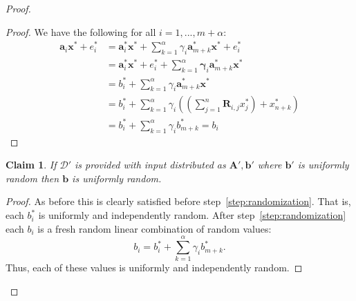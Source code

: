 \documentclass[11pt]{article}
\newcommand{\vect}[1]{\ensuremath{\textbf{#1}}}
\newcommand{\D}{\mathcal{D}}
\newtheorem{claim}[theorem]{Claim}
\newcommand{\vA}{\vect{A}}
\newcommand{\vR}{\vect{R}}
\newcommand{\vx}{\vect{x}}
\newcommand{\va}{\vect{a}}
\newcommand{\vb}{\vect{b}}
\begin{document}
\begin{proof}
\begin{proof}
We have the following for all $i=1,..., m+\alpha$:
\begin{align*}
\va_i \vx^* + e_i^* &=\va^*_i\vx^*+\sum_{k=1}^\alpha \gamma_{i} \va^*_{m+k}\vx^*+e_i^*\\
&= \va_i^*\vx^* + e_i^* + \sum_{k=1}^\alpha \mathbf{\gamma}_{i} \va^*_{m+k}\vx^*\\
&= b_i^* + \sum_{k=1}^\alpha\gamma_i \va_{m+k}^* \vx^*\\
&= b_i^* + \sum_{k=1}^\alpha \gamma_i \left(\left( \sum_{j=1}^n \vR_{i, j}x_j^* \right) + x_{n+k}^*\right)\\
&= b_i^* +\sum_{k=1}^\alpha\gamma_i b_{m+k}^*= b_i
\end{align*}
\end{proof}
\begin{claim} 
\label{clm:random b}
If $\D'$ is provided with input distributed as $\vA', \vb'$ where $\vb'$ is uniformly random then $\vb$ is uniformly random.
\end{claim}
\begin{proof}
As before this is clearly satisfied before step~\ref{step:randomization}.  That is, each $b_i^*$ is uniformly and independently random.  After step~\ref{step:randomization} each $b_i$ is a fresh random linear combination of random values:
\[
b_i = b_i^* + \sum_{k=1}^\alpha \gamma_i b_{m+k}^*.
\]
Thus, each of these values is uniformly and independently random.
\end{proof}


\end{proof}
\end{document}
